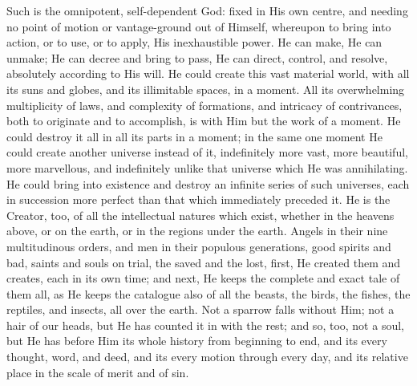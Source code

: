 Such is the omnipotent, self-dependent God: fixed in
His own centre, and needing no point of motion or vantage-ground out of Himself, whereupon to bring into
action, or to use, or to apply, His inexhaustible power.
He can make, He can unmake; He can decree and bring to
pass, He can direct, control, and resolve, absolutely
according to His will. He could create this vast material
world, with all its suns and globes, and its illimitable
spaces, in a moment. All its overwhelming multiplicity of
laws, and complexity of formations, and intricacy of
contrivances, both to originate and to accomplish, is
with Him but the work of a moment. He could destroy it
all in all its parts in a moment; in the same one moment
He could create another universe instead of it,
indefinitely more vast, more beautiful, more marvellous,
and indefinitely unlike that universe which He was
annihilating. He could bring into existence and destroy
an infinite series of such universes, each in succession
more perfect than that which immediately preceded it. He
is the Creator, too, of all the intellectual natures
which exist, whether in the heavens above, or on the
earth, or in the regions under the earth. Angels in their
nine multitudinous orders, and men in their populous
generations, good spirits and bad, saints and souls on
trial, the saved and the lost, first, He created them and
creates, each in its own time; and next, He keeps the
complete and exact tale of them all, as He keeps the
catalogue also of all the beasts, the birds, the fishes,
the reptiles, and insects, all over the earth. Not a
sparrow falls without Him; not a hair of our heads, but
He has counted it in with the rest; and so, too, not a
soul, but He has before Him its whole history from
beginning to end, and its every thought, word, and deed,
and its every motion through every day, and its relative
place in the scale of merit and of sin.

